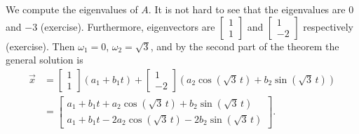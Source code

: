 \documentclass{ximera}
\begin{document}
\begin{exampleSol}
    We compute the eigenvalues of $A$.  It is not hard to see that the eigenvalues are 0 and $-3$ (exercise).  Furthermore, eigenvectors are $\left[ \begin{smallmatrix} 1 \\ 1 \end{smallmatrix} \right]$ and $\left[ \begin{smallmatrix} 1 \\ -2 \end{smallmatrix} \right]$ respectively (exercise). Then $\omega_1 = 0$, $\omega_2 = \sqrt{3}$, and by the second part of the theorem the general solution is
    \begin{equation*}
        \begin{split}
            \vec{x} & = 
            \begin{bmatrix} 
                1 \\ 
                1 
            \end{bmatrix}
            \left( a_1 + b_1 t \right)  +
            \begin{bmatrix} 
                1 \\ 
                -2 
            \end{bmatrix}
            \left( a_2 \cos ( \sqrt{3} \, t) + b_2 \sin ( \sqrt{3} \, t ) \right) \\
            & =
            \begin{bmatrix}
                a_1 + b_1 t + a_2 \cos ( \sqrt{3} \, t ) + b_2 \sin ( \sqrt{3} \, t ) \\
                a_1 + b_1 t - 2 a_2 \cos ( \sqrt{3} \, t ) - 2 b_2 \sin ( \sqrt{3} \, t ) 
            \end{bmatrix} .
        \end{split}
    \end{equation*}
    

\end{exampleSol}
\end{document}
